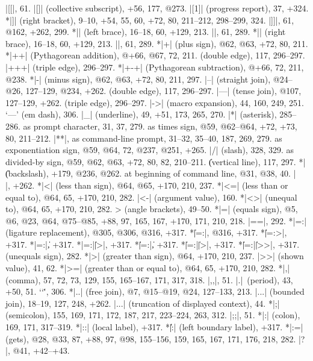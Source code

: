 |[[|, 61.
|[]| (collective subscript), +56, 177, @273.
|[1]| (progress report), 37, +324.
*|]| (right bracket), 9--10, +54, 55, 60, +72, 80, 211--212, 298--299, 324.
|]]|, 61, @162, +262, 299.
*|{| (left brace), 16--18, 60, +129, 213.
|{{|, 61, 289.
*|}| (right brace), 16--18, 60, +129, 213.
|}}|, 61, 289.
*|+| (plus sign), @62, @63, +72, 80, 211.
*|++| (Pythagorean addition), @+66, @67, 72, 211.
\sub (double edge), 117, 296--297.
|+++| (triple edge), 296--297.
*|+-+| (Pythagorean subtraction), @+66, 72, 211, @238.
*|-| (minus sign), @62, @63, +72, 80, 211, 297.
|--| (straight join), @24--@26, 127--129, @234, +262.
\sub (double edge), 117, 296--297.
|---| (tense join), @107, 127--129, +262.
\sub (triple edge), 296--297.
|->| (macro expansion), 44, 160, 249, 251.
`---' (em dash), 306.
|_| (underline), 49, +51, 173, 265, 270.
|*| (asterisk), 285--286.
\sub as prompt character, 31, 37, 279.
\sub {}as times sign, @59, @62--@64, +72, +73, 80, 211--212.
|**|, as command-line prompt, 31--32, 35--40, 187, 269, 279.
\sub as exponentiation sign, @59, @64, 72, @237, @251, +265.
|/| (slash), 328, 329.
\sub {}as divided-by sign, @59, @62, @63, +72, 80, 82, 210--211.
\| (vertical line), 117, 297.
*|\| (backslash), +179, @236, @262.
\sub at beginning of command line, @31, @38, 40.
|\\|, +262.
*|<| (less than sign), @64, @65, +170, 210, 237.
*|<=| (less than or equal to), @64, 65, +170, 210, 282.
|<-| (argument value), 160.
*|<>| (unequal to),  @64, 65, +170, 210, 282.
\<> (angle brackets), 49--50.
*|=| (equals sign), @5, @6, @23, @64, @75--@85, +88, 97, 165, 167, +170,
 171, 210, 218.
|==|, 292.
*|=:| (ligature replacement), @305, @306, @316, +317.
*\||=:|, @316, +317.
*\||=:>|, +317.
*|=:|\|, +317.
*|=:|\||>|, +317.
*\||=:|\|, +317.
*\||=:|\||>|, +317.
*\||=:|\||>>|, +317.
\leavevmode{\tt \rlap/=} (unequals sign), 282.
*|>| (greater than sign), @64, +170, 210, 237.
|>>| (shown value), 41, 62.
*|>=| (greater than or equal to), @64, 65, +170, 210, 282.
*|,| (comma), 57, 72, 73, 129, 155, 165--167, 171, 317, 318.
|,,|\thinspace, 51.
|.|~(period), 43, +50, 51.
`\char`\.', 306.
*|..| (free join), @7, @15--@19, @24, 127--133, 213.
|...| (bounded join), 18--19, 127, 248, +262.
|...| (truncation of displayed context), 44.
*|;| (semicolon), 155, 169, 171, 172, 187, 217, 223--224, 263, 312.
|;;|\thinspace, 51.
*|:| (colon), 169, 171, 317--319.
*|::| (local label), +317.
*\|\||:| (left boundary label), +317.
*|:=| (gets), @28, @33, 87, +88, 97, @98, 155--156, 159, 165, 167, 171,
 176, 218, 282.
|?|, @41, +42--+43.
